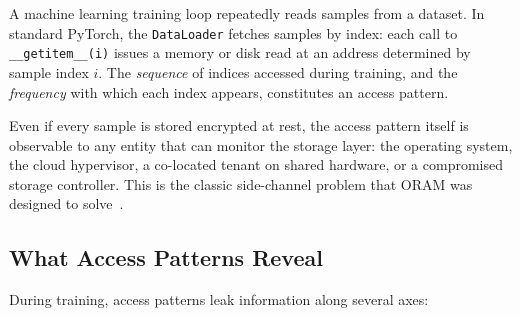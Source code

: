 \documentclass[11pt]{article}
\begin{document}
A machine learning training loop repeatedly reads samples from a dataset.
In standard PyTorch, the \texttt{DataLoader} fetches samples by index: each call to \texttt{\_\_getitem\_\_(i)} issues a memory or disk read at an address determined by sample index $i$.
The \emph{sequence} of indices accessed during training, and the \emph{frequency} with which each index appears, constitutes an access pattern.

Even if every sample is stored encrypted at rest, the access pattern itself is observable to any entity that can monitor the storage layer: the operating system, the cloud hypervisor, a co-located tenant on shared hardware, or a compromised storage controller.
This is the classic side-channel problem that ORAM was designed to solve~\cite{goldreich1996,stefanov2013}.

\subsection{What Access Patterns Reveal}

During training, access patterns leak information along several axes:
\end{document}
